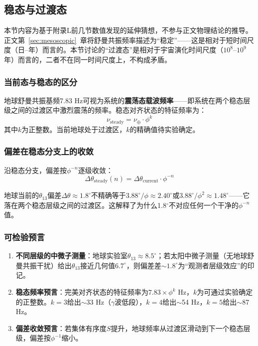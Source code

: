 \subsection{稳态与过渡态}
\label{subsec:steady_transition}

\begin{remark}[本节性质]
本节内容为基于附录L前几节数值发现的延伸猜想，不参与正文物理结论的推导。正文第~\ref{sec:mesoscopic}~章将舒曼共振频率描述为``稳定''——这是相对于短时间尺度（日--年）而言的。本节讨论的``过渡态''是相对于宇宙演化时间尺度（$10^8$--$10^9$年）而言的，二者不在同一时间尺度上，不构成矛盾。
\end{remark}

\subsubsection{当前态与稳态的区分}

\begin{remark}[震荡态与稳态的物理区分]
地球舒曼共振基频7.83 Hz可视为系统的\textbf{震荡态载波频率}——即系统在两个稳态层级之间的过渡区中激烈震荡的频率。稳态对齐状态的特征频率为：
\begin{equation}
\nu_{\text{steady}} = \nu_{\oplus} \cdot \phi^k
\label{eq:steady_freq}
\end{equation}
其中$k$为正整数。当前地球处于过渡区，$k$的精确值待实验确定。
\end{remark}

\subsubsection{偏差在稳态分支上的收敛}

沿稳态分支，偏差按$\phi^{-n}$逐级收敛：
\begin{equation}
\Delta\theta_{\text{steady}}(n) = \Delta\theta_{\text{current}} \cdot \phi^{-n}
\label{eq:deviation_convergence}
\end{equation}

地球当前的$\theta_{13}$偏差$\Delta\theta \approx 1.8^\circ$不精确等于$3.88^\circ/\phi \approx 2.40^\circ$或$3.88^\circ/\phi^2 \approx 1.48^\circ$——它落在两个稳态层级之间的过渡区。这解释了为什么1.8$^\circ$不对应任何一个干净的$\phi^{-n}$值。

\subsubsection{可检验预言}

\begin{enumerate}
\item \textbf{不同层级的中微子测量}：地球实验室$\theta_{13}\approx 8.5^\circ$；若太阳中微子测量（无地球舒曼共振干扰）给出$\theta_{13}$接近几何值$6.7^\circ$，则偏差差$\sim 1.8^\circ$为``观测者层级效应''的印记。
\item \textbf{稳态频率预言}：完美对齐状态的特征频率为$7.83\times\phi^k$ Hz，$k$为可通过实验确定的正整数。$k=3$给出$\sim$33 Hz（$\gamma$波低段），$k=4$给出$\sim$54 Hz，$k=5$给出$\sim$87 Hz。
\item \textbf{偏差收敛预言}：若集体有序度$S$提升，地球频率从过渡区滑动到下一个稳态层级，偏差按$\phi^{-1}$缩小。
\end{enumerate}

